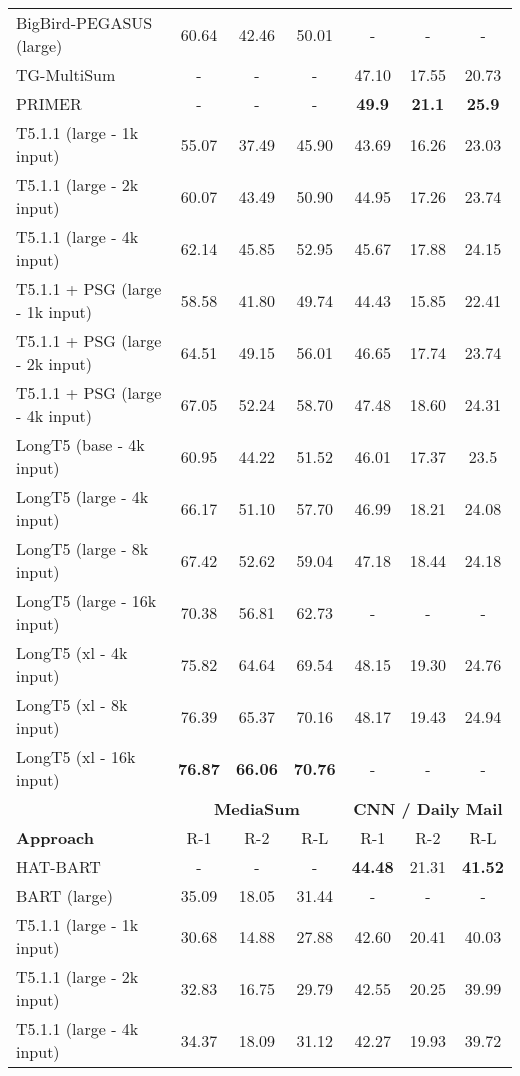 \documentclass[11pt]{article}
\begin{document}
\begin{table*}
\begin{tabular}{lcccccc}
\midrule
BigBird-PEGASUS (large) & 60.64 & 42.46 & 50.01 & - & - & -  \\
TG-MultiSum & - & - & - & 47.10 & 17.55 & 20.73 \\
PRIMER & - & - & - & \textbf{49.9} & \textbf{21.1} & \textbf{25.9} \\
\midrule
T5.1.1 (large - 1k input) & 55.07 & 37.49 & 45.90 & 43.69 & 16.26 & 23.03 \\
T5.1.1 (large - 2k input) & 60.07 & 43.49 & 50.90 & 44.95 & 17.26 & 23.74 \\
T5.1.1 (large - 4k input) & 62.14 & 45.85 & 52.95 & 45.67 & 17.88 & 24.15 \\
T5.1.1 + PSG (large - 1k input) & 58.58 & 41.80 & 49.74 & 44.43 & 15.85 & 22.41 \\
T5.1.1 + PSG (large - 2k input) & 64.51 & 49.15 & 56.01 & 46.65 & 17.74 & 23.74 \\
T5.1.1 + PSG (large - 4k input) & 67.05 & 52.24 & 58.70 & 47.48 & 18.60 & 24.31 \\
LongT5 (base - 4k input) & 60.95 & 44.22 & 51.52 & 46.01 & 17.37 & 23.5 \\
LongT5 (large - 4k input) & 66.17 & 51.10 & 57.70 & 46.99 & 18.21 & 24.08 \\
LongT5 (large - 8k input) & 67.42 & 52.62 & 59.04 & 47.18 & 18.44 & 24.18 \\
LongT5 (large - 16k input) & 70.38 & 56.81 & 62.73 & - & - & - \\
LongT5 (xl - 4k input) &  75.82 & 64.64 & 69.54 & 48.15 & 19.30 & 24.76 \\
LongT5 (xl - 8k input) & 76.39 & 65.37 & 70.16 & 48.17 & 19.43 & 24.94 \\
LongT5 (xl - 16k input) & \textbf{76.87} & \textbf{66.06} & \textbf{70.76} & - & - & - \\
\toprule
& \multicolumn{3}{c}{\textbf{MediaSum}} & \multicolumn{3}{c}{\textbf{CNN / Daily Mail}} \\
\textbf{Approach} & R-1 & R-2 & R-L & R-1 & R-2 & R-L\\
\midrule
HAT-BART & - & - & - & \textbf{44.48} & 21.31 & \textbf{41.52} \\
BART (large) & 35.09 & 18.05 & 31.44 & - & - & -   \\
\midrule
T5.1.1 (large - 1k input) & 30.68 & 14.88 & 27.88 & 42.60 & 20.41 & 40.03 \\
T5.1.1 (large - 2k input) & 32.83 & 16.75 & 29.79 & 42.55 & 20.25 & 39.99 \\
T5.1.1 (large - 4k input) & 34.37 & 18.09 & 31.12 & 42.27 & 19.93 & 39.72 \\

\end{tabular}
\end{table*}
\end{document}
